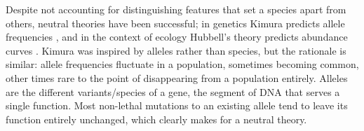 Despite not accounting for distinguishing features that set a species apart from others, neutral theories have been successful; in genetics Kimura predicts allele frequencies \cite{Kimura1955,Kimura1983}, and in the context of ecology Hubbell's theory predicts abundance curves \cite{Bell2001,Hubbell2001,Leibold2006,Rosindell2011}. 
%
Kimura was inspired by alleles rather than species, but the rationale is similar: allele frequencies fluctuate in a population, sometimes becoming common, other times rare to the point of disappearing from a population entirely. %
Alleles are the different variants/species of a gene, the segment of DNA that serves a single function. 
Most non-lethal mutations to an existing allele tend to leave its function entirely unchanged, which clearly makes for a neutral theory. 
%


